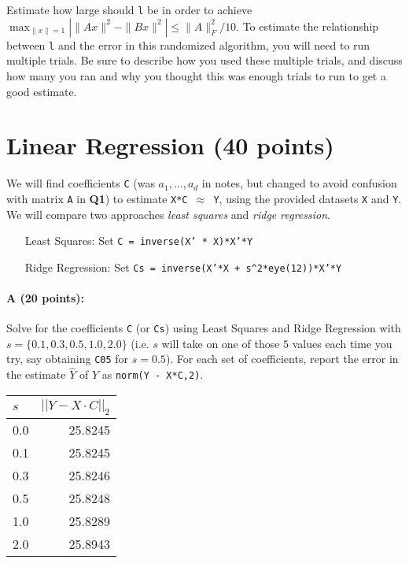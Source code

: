 \documentclass[11pt]{article}
\begin{document}
Estimate how large should \texttt{l} be in order to achieve $\max_{\|x\|=1} | \|A x\|^2 - \|B x\|^2 | \leq \|A\|_F^2/10$.  To estimate the relationship between \texttt{l} and the error in this randomized algorithm, you will need to run multiple trials.  Be sure to describe how you used these multiple trials, and discuss how many you ran and why you thought this was enough trials to run to get a good estimate.  




\section{Linear Regression (40 points)}

We will find coefficients \texttt{C} (was $a_1, \ldots, a_d$ in notes, but changed to avoid confusion with matrix \texttt{A} in {\bf{\sffamily Q1}}) to estimate \texttt{X*C $\approx$ Y}, using the provided datasets \texttt{X} and \texttt{Y}.  We will compare two approaches \emph{least squares} and \emph{ridge regression}.  

\begin{itemize} \denselist
\item[\textsf{Least Squares:} ]  Set \texttt{C = inverse(X' * X)*X'*Y}
\item[\textsf{Ridge Regression:} ] Set \texttt{Cs = inverse(X'*X + s\^{}2*eye(12))*X'*Y}
\end{itemize}

\paragraph{A (20 points): }
Solve for the coefficients \texttt{C} (or \texttt{Cs}) using Least Squares and Ridge Regression with $s = \{0.1, 0.3, 0.5, 1.0, 2.0\}$ (i.e. $s$ will take on one of those $5$ values each time you try, say obtaining \texttt{C05} for $s=0.5$).  
For each set of coefficients, report the error in the estimate $\hat{Y}$ of $Y$ as 
\texttt{norm(Y - X*C,2)}.

\begin{table}[H]
\centering
\begin{tabular}{@{}l r@{}}
\hline\hline
$s$ & $\left|\left| Y - X\cdot C\right|\right|_{2}$\\
\hline
0.0 & 25.8245 \\
0.1 & 25.8245 \\
0.3 & 25.8246 \\
0.5 & 25.8248 \\
1.0 & 25.8289 \\
2.0 & 25.8943 \\
\hline
\end{tabular}
\end{table}
\end{document}
